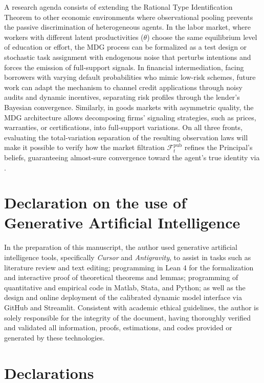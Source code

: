 \documentclass[pdflatex,sn-mathphys-ay]{sn-jnl}
\theoremstyle{plain}
\theoremstyle{definition}
\newcommand{\1}{\mathbf{1}}
\begin{document}
A research agenda consists of extending the Rational Type Identification Theorem to other economic environments where observational pooling prevents the passive discrimination of heterogeneous agents. In the labor market, where workers with different latent productivities ($\theta$) choose the same equilibrium level of education or effort, the MDG process can be formalized as a test design or stochastic task assignment with endogenous noise that perturbs intentions and forces the emission of full-support signals. In financial intermediation, facing borrowers with varying default probabilities who mimic low-risk schemes, future work can adapt the mechanism to channel credit applications through noisy audits and dynamic incentives, separating risk profiles through the lender's Bayesian convergence. Similarly, in goods markets with asymmetric quality, the MDG architecture allows decomposing firms' signaling strategies, such as prices, warranties, or certifications, into full-support variations. On all three fronts, evaluating the total-variation separation of the resulting observation laws will make it possible to verify how the market filtration $\mathcal{F}_t^{\mathrm{pub}}$ refines the Principal's beliefs, guaranteeing almost-sure convergence toward the agent's true identity via \citet{Kakutani1948}.

\backmatter

\section*{Declaration on the use of Generative Artificial Intelligence}
In the preparation of this manuscript, the author used generative artificial intelligence tools, specifically \emph{Cursor} and \emph{Antigravity}, to assist in tasks such as literature review and text editing; programming in Lean 4 for the formalization and interactive proof of theoretical theorems and lemmas; programming of quantitative and empirical code in Matlab, Stata, and Python; as well as the design and online deployment of the calibrated dynamic model interface via GitHub and Streamlit. Consistent with academic ethical guidelines, the author is solely responsible for the integrity of the document, having thoroughly verified and validated all information, proofs, estimations, and codes provided or generated by these technologies.

\section*{Declarations}
\end{document}
